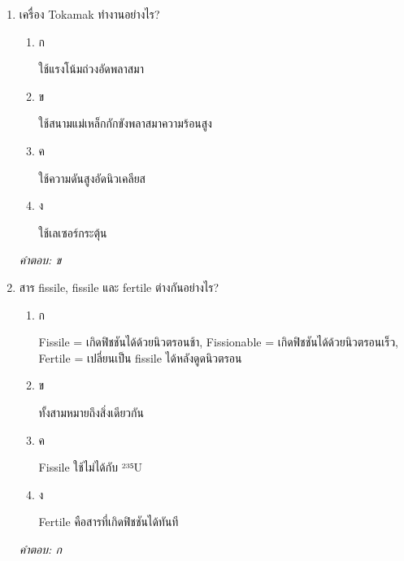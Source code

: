 \documentclass[12pt]{article}
\begin{document}
\begin{enumerate}[label=\arabic*., itemsep=0.5\baselineskip, topsep=0.5\baselineskip, leftmargin=*]
\item เครื่อง Tokamak ทำงานอย่างไร?
\begin{enumerate}[label=\alph*)., itemsep=0.3\baselineskip, topsep=0.3\baselineskip]
\item ก\ 
\begin{minipage}[t]{0.9\linewidth}
\raggedright ใช้แรงโน้มถ่วงอัดพลาสมา
\end{minipage}
\item ข\ 
\begin{minipage}[t]{0.9\linewidth}
\raggedright ใช้สนามแม่เหล็กกักขังพลาสมาความร้อนสูง
\end{minipage}
\item ค\ 
\begin{minipage}[t]{0.9\linewidth}
\raggedright ใช้ความดันสูงอัดนิวเคลียส
\end{minipage}
\item ง\ 
\begin{minipage}[t]{0.9\linewidth}
\raggedright ใช้เลเซอร์กระตุ้น
\end{minipage}
\end{enumerate}
\vspace{-0.3\baselineskip}
\begin{small}
\textit{คำตอบ: ข}
\end{small}

\item สาร fissile, fissile และ fertile ต่างกันอย่างไร?
\begin{enumerate}[label=\alph*)., itemsep=0.3\baselineskip, topsep=0.3\baselineskip]
\item ก\ 
\begin{minipage}[t]{0.9\linewidth}
\raggedright Fissile = เกิดฟิชชันได้ด้วยนิวตรอนช้า, Fissionable = เกิดฟิชชันได้ด้วยนิวตรอนเร็ว, Fertile = เปลี่ยนเป็น fissile ได้หลังดูดนิวตรอน
\end{minipage}
\item ข\ 
\begin{minipage}[t]{0.9\linewidth}
\raggedright ทั้งสามหมายถึงสิ่งเดียวกัน
\end{minipage}
\item ค\ 
\begin{minipage}[t]{0.9\linewidth}
\raggedright Fissile ใช้ไม่ได้กับ ²³⁵U
\end{minipage}
\item ง\ 
\begin{minipage}[t]{0.9\linewidth}
\raggedright Fertile คือสารที่เกิดฟิชชันได้ทันที
\end{minipage}
\end{enumerate}
\vspace{-0.3\baselineskip}
\begin{small}
\textit{คำตอบ: ก}
\end{small}


\end{enumerate}
\end{document}
